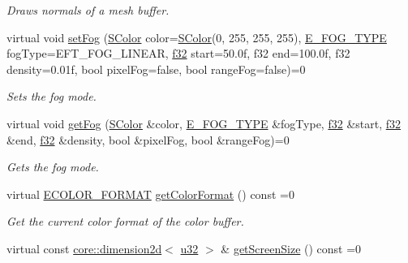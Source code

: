 \begin{DoxyCompactItemize}
\begin{DoxyCompactList}\small\item\em Draws normals of a mesh buffer. \end{DoxyCompactList}\item 
virtual void \hyperlink{classirr_1_1video_1_1IVideoDriver_af8cbb090b42198244c1703eb17024bbc}{set\+Fog} (\hyperlink{classirr_1_1video_1_1SColor}{S\+Color} color=\hyperlink{classirr_1_1video_1_1SColor}{S\+Color}(0, 255, 255, 255), \hyperlink{namespaceirr_1_1video_adf41b1a85e067f5988ba1eb8bb50f44e}{E\+\_\+\+F\+O\+G\+\_\+\+T\+Y\+PE} fog\+Type=E\+F\+T\+\_\+\+F\+O\+G\+\_\+\+L\+I\+N\+E\+AR, \hyperlink{namespaceirr_a0277be98d67dc26ff93b1a6a1d086b07}{f32} start=50.\+0f, f32 end=100.\+0f, f32 density=0.\+01f, bool pixel\+Fog=false, bool range\+Fog=false)=0
\begin{DoxyCompactList}\small\item\em Sets the fog mode. \end{DoxyCompactList}\item 
\mbox{\label{classirr_1_1video_1_1IVideoDriver_a29435c6a654675bdb276c89fd4a1356c}} 
virtual void \hyperlink{classirr_1_1video_1_1IVideoDriver_a29435c6a654675bdb276c89fd4a1356c}{get\+Fog} (\hyperlink{classirr_1_1video_1_1SColor}{S\+Color} \&color, \hyperlink{namespaceirr_1_1video_adf41b1a85e067f5988ba1eb8bb50f44e}{E\+\_\+\+F\+O\+G\+\_\+\+T\+Y\+PE} \&fog\+Type, \hyperlink{namespaceirr_a0277be98d67dc26ff93b1a6a1d086b07}{f32} \&start, \hyperlink{namespaceirr_a0277be98d67dc26ff93b1a6a1d086b07}{f32} \&end, \hyperlink{namespaceirr_a0277be98d67dc26ff93b1a6a1d086b07}{f32} \&density, bool \&pixel\+Fog, bool \&range\+Fog)=0
\begin{DoxyCompactList}\small\item\em Gets the fog mode. \end{DoxyCompactList}\item 
virtual \hyperlink{namespaceirr_1_1video_a1d5e487888c32b1674a8f75116d829ed}{E\+C\+O\+L\+O\+R\+\_\+\+F\+O\+R\+M\+AT} \hyperlink{classirr_1_1video_1_1IVideoDriver_afc8f27bfd9756f4ca8de2d4bb37b0e15}{get\+Color\+Format} () const =0
\begin{DoxyCompactList}\small\item\em Get the current color format of the color buffer. \end{DoxyCompactList}\item 
virtual const \hyperlink{classirr_1_1core_1_1dimension2d}{core\+::dimension2d}$<$ \hyperlink{namespaceirr_a0416a53257075833e7002efd0a18e804}{u32} $>$ \& \hyperlink{classirr_1_1video_1_1IVideoDriver_aa106dd9ff233497f9ea9a07dc6441c82}{get\+Screen\+Size} () const =0

\end{DoxyCompactItemize}
